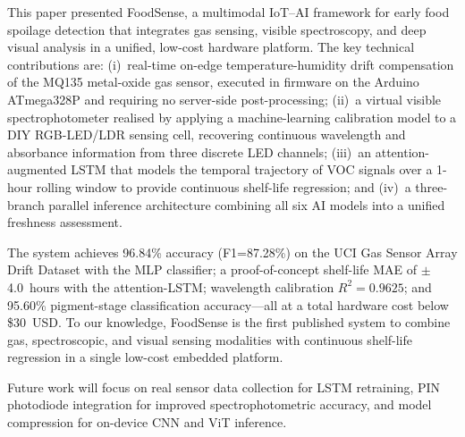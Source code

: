 \documentclass{ieeeaccess}
\begin{document}
This paper presented FoodSense, a multimodal IoT--AI framework for early food spoilage detection that integrates gas sensing, visible spectroscopy, and deep visual analysis in a unified, low-cost hardware platform. The key technical contributions are: (i)~real-time on-edge temperature-humidity drift compensation of the MQ135 metal-oxide gas sensor, executed in firmware on the Arduino ATmega328P and requiring no server-side post-processing; (ii)~a virtual visible spectrophotometer realised by applying a machine-learning calibration model to a DIY RGB-LED/LDR sensing cell, recovering continuous wavelength and absorbance information from three discrete LED channels; (iii)~an attention-augmented LSTM that models the temporal trajectory of VOC signals over a 1-hour rolling window to provide continuous shelf-life regression; and (iv)~a three-branch parallel inference architecture combining all six AI models into a unified freshness assessment.

The system achieves 96.84\% accuracy (F1=87.28\%) on the UCI Gas Sensor Array Drift Dataset with the MLP classifier; a proof-of-concept shelf-life MAE of $\pm$4.0~hours with the attention-LSTM; wavelength calibration $R^2=0.9625$; and 95.60\% pigment-stage classification accuracy---all at a total hardware cost below \$30~USD. To our knowledge, FoodSense is the first published system to combine gas, spectroscopic, and visual sensing modalities with continuous shelf-life regression in a single low-cost embedded platform.

Future work will focus on real sensor data collection for LSTM retraining, PIN photodiode integration for improved spectrophotometric accuracy, and model compression for on-device CNN and ViT inference.




\EOD
\end{document}
